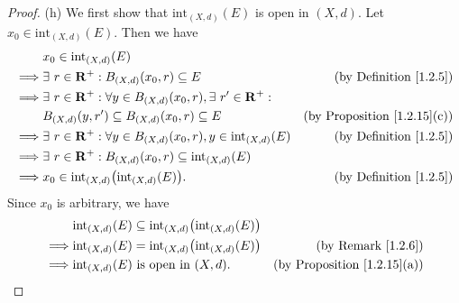 \begin{proof}{(h)}
    We first show that \(\text{int}_{(X, d)}(E)\) is open in \((X, d)\).
    Let \(x_0 \in \text{int}_{(X, d)}(E)\).
    Then we have
    \begin{align*}
                 & x_0 \in \text{int}_{(X, d)}(E)                                                                                                           \\
        \implies & \exists\ r \in \mathbf{R}^+ : B_{(X, d)}(x_0, r) \subseteq E                                   & \text{(by Definition \ref{1.2.5})}      \\
        \implies & \exists\ r \in \mathbf{R}^+ : \forall y \in B_{(X, d)}(x_0, r), \exists\ r' \in \mathbf{R}^+ :                                           \\
                 & B_{(X, d)}(y, r') \subseteq B_{(X, d)}(x_0, r) \subseteq E                                     & \text{(by Proposition \ref{1.2.15}(c))} \\
        \implies & \exists\ r \in \mathbf{R}^+ : \forall y \in B_{(X, d)}(x_0, r), y \in \text{int}_{(X, d)}(E)   & \text{(by Definition \ref{1.2.5})}      \\
        \implies & \exists\ r \in \mathbf{R}^+ : B_{(X, d)}(x_0, r) \subseteq \text{int}_{(X, d)}(E)                                                        \\
        \implies & x_0 \in \text{int}_{(X, d)}\big(\text{int}_{(X, d)}(E)\big).                                   & \text{(by Definition \ref{1.2.5})}
    \end{align*}
    Since \(x_0\) is arbitrary, we have
    \begin{align*}
                 & \text{int}_{(X, d)}(E) \subseteq \text{int}_{(X, d)}\big(\text{int}_{(X, d)}(E)\big)                                           \\
        \implies & \text{int}_{(X, d)}(E) = \text{int}_{(X, d)}\big(\text{int}_{(X, d)}(E)\big)         & \text{(by Remark \ref{1.2.6})}          \\
        \implies & \text{int}_{(X, d)}(E) \text{ is open in } (X, d).                                   & \text{(by Proposition \ref{1.2.15}(a))}
    \end{align*}


\end{proof}
